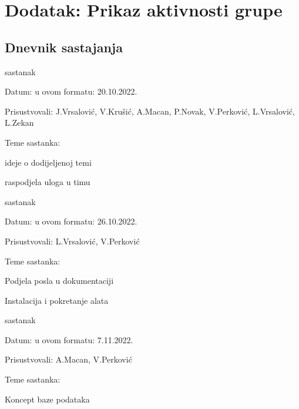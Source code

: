 \chapter*{Dodatak: Prikaz aktivnosti grupe}
		
		\section*{Dnevnik sastajanja}
		
		
		
		\begin{packed_enum}
			\item  sastanak
			
			\item[] \begin{packed_item}
				\item Datum: u ovom formatu: 20.10.2022.
				\item Prisustvovali: J.Vrsalović, V.Krušić, A.Macan, P.Novak, V.Perković, L.Vrsalović, L.Zekan
				\item Teme sastanka:
				\begin{packed_item}
					\item  ideje o dodijeljenoj temi
					\item  raspodjela uloga u timu
				\end{packed_item}
			\end{packed_item}
			
			\item  sastanak
			\item[] \begin{packed_item}
				\item Datum: u ovom formatu: 26.10.2022.
				\item Prisustvovali: L.Vrsalović, V.Perković
				\item Teme sastanka:
				\begin{packed_item}
					\item  Podjela posla u dokumentaciji
					\item  Instalacija i pokretanje alata
				\end{packed_item}
			\end{packed_item}
			
			\item  sastanak
			\item[] \begin{packed_item}
				\item Datum: u ovom formatu: 7.11.2022.
				\item Prisustvovali: A.Macan, V.Perković
				\item Teme sastanka:
				\begin{packed_item}
					\item  Koncept baze podataka
				\end{packed_item}
			\end{packed_item}
			

\end{packed_enum}
